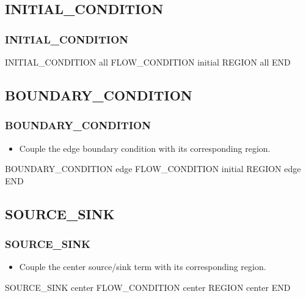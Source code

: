\documentclass{beamer}
\newcommand\greencomment[1]{{{\color{green} #1}}}
\begin{document}
\subsection{INITIAL\_CONDITION}

\begin{frame}[fragile]\frametitle{INITIAL\_CONDITION}

\begin{semiverbatim}
INITIAL_CONDITION all
  FLOW_CONDITION initial
  REGION all
END
\end{semiverbatim}

\end{frame}

\subsection{BOUNDARY\_CONDITION}

\begin{frame}[fragile]\frametitle{BOUNDARY\_CONDITION}

\begin{itemize}
\item Couple the \greencomment{edge} boundary condition with its corresponding region.
\end{itemize}

\begin{semiverbatim}
BOUNDARY_CONDITION edge
  FLOW_CONDITION initial
  REGION edge
END
\end{semiverbatim}

\end{frame}

\subsection{SOURCE\_SINK}

\begin{frame}[fragile]\frametitle{SOURCE\_SINK}

\begin{itemize}
\item Couple the \greencomment{center} source/sink term with its corresponding region.
\end{itemize}

\begin{semiverbatim}
SOURCE_SINK center
  FLOW_CONDITION center
  REGION center
END
\end{semiverbatim}

\end{frame}
\end{document}
